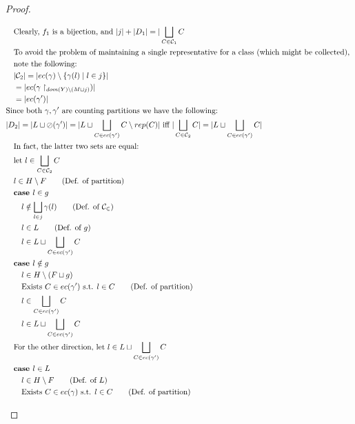 \documentclass[11pt]{article}
\newcommand{\oh}[1]{\oslash(#1)}
\theoremstyle{definition}
\begin{document}
\begin{proof}
\begin{description}
\begin{align*}
		&\quad \text{Clearly, } f_1 \text{ is a bijection, and } |j| + |D_1| = |\bigsqcup_{C \in \mathcal{C}_1} C\\
		&\quad \text{To avoid the problem of maintaining a single representative for a class (which might be 
		collected), }\\
		&\quad \text{note the following: }\\
		&\quad |\mathcal{C}_2| = |ec(\gamma) \setminus \{\gamma(l) \mid l \in j\}|\\
		&\quad = |ec(\gamma \restriction_{dom(Y) \setminus (M \sqcup j)})|\\
		&\quad = |ec(\gamma')|\\
		&\text{Since both } \gamma,\gamma' \text{ are counting partitions we have the following: }\\
		&|D_2| = |L \sqcup \oh{\gamma'}| = |L \sqcup \bigsqcup_{C \in ec(\gamma')} C \setminus rep(C)| \text{ iff }
		|\bigsqcup_{C  \in \mathcal{C}_2} C| = |L \sqcup \bigsqcup_{C \in ec(\gamma')} C|\\ 
		&\quad \text{In fact, the latter two sets are equal: }\\
		&\quad \text{let } l \in \bigsqcup_{C  \in \mathcal{C}_2} C\\
		&\quad l \in H \setminus F \tag{Def. of partition}\\
		&\quad \textbf{case } l \in g\\
		&\quad\quad l \notin \bigsqcup_{l \in j} \gamma(l) \tag{Def. of $\mathcal{C_2}$}\\
		&\quad\quad l \in L \tag{Def. of $g$}\\
		&\quad\quad l \in L \sqcup \bigsqcup_{C \in ec(\gamma')} C\\
		&\quad \textbf{case } l \notin g\\
		&\quad\quad l \in H \setminus (F \sqcup g)\\
		&\quad\quad \text{Exists } C \in ec(\gamma') \text{ s.t. } l \in C \tag{Def. of partition}\\
		&\quad\quad l \in \bigsqcup_{C \in ec(\gamma')} C\\
		&\quad\quad l \in L \sqcup \bigsqcup_{C \in ec(\gamma')} C\\
		&\quad\text{For the other direction, let } l \in L \sqcup \bigsqcup_{C \in ec(\gamma')} C\\
		&\quad\textbf{case } l \in L\\
		&\quad\quad l \in H \setminus F \tag{Def. of $L$}\\
		&\quad\quad \text{Exists } C \in ec(\gamma) \text{ s.t. } l \in C \tag{Def. of partition}\\

\end{align*}
\end{description}
\end{proof}
\end{document}
